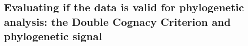 \documentclass[12pt,letterpaper]{article}
\begin{document}






\FloatBarrier
\subsection{Evaluating if the data is valid for phylogenetic analysis: the Double Cognacy Criterion and phylogenetic signal}
\label{sec:is_it_valid}
\end{document}
